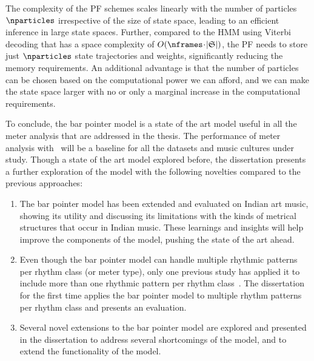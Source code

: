 The complexity of the PF schemes scales linearly with the number of particles $\nparticles$ irrespective of the size of state space, leading to an efficient inference in large state spaces. Further, compared to the \gls{HMM} using Viterbi decoding that has a space complexity of $O(\nframes\!\cdot\!\lvert \mathfrak{S} \rvert)$, the PF needs to store just $\nparticles$ state trajectories and weights, significantly reducing the memory requirements. An additional advantage is that the number of particles can be chosen based on the computational power we can afford, and we can make the state space larger with no or only a marginal increase in the computational requirements. 

To conclude, the bar pointer model is a state of the art model useful in all the meter analysis that are addressed in the thesis. The performance of meter analysis with \bpmodel\ will be a baseline for all the datasets and music cultures under study. Though a state of the art model explored before, the dissertation presents a further exploration of the model with the following novelties compared to the previous approaches: 
\begin{enumerate}[leftmargin=*,noitemsep]
 \item The bar pointer model has been extended and evaluated on Indian art music, showing its utility and discussing its limitations with the kinds of metrical structures that occur in Indian music. These learnings and insights will help improve the components of the model, pushing the state of the art ahead. 
 \item Even though the bar pointer model can handle multiple rhythmic patterns per rhythm class (or meter type), only one previous study has applied it to include more than one rhythmic pattern per rhythm class~\cite{holzapfel:14:odd}. The dissertation for the first time applies the bar pointer model to multiple rhythm patterns per rhythm class and presents an evaluation. 
 \item Several novel extensions to the bar pointer model are explored and presented in the dissertation to address several shortcomings of the model, and to extend the functionality of the model. 
\end{enumerate}
